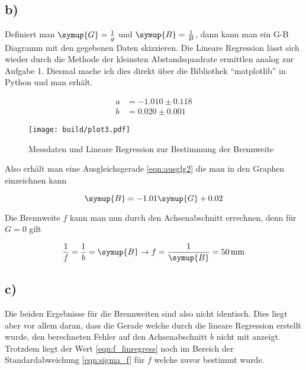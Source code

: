 \subsection{b)}
Definiert man $\symup{G} = \frac{1}{g}$ und $\symup{B} = \frac{1}{B}$, dann kann man ein G-B Diagramm mit den gegebenen
Daten skizzieren. Die Lineare Regression lässt sich wieder durch die Methode der kleinsten Abstandsquadrate ermittlen analog zur Aufgabe 1. Diesmal mache ich dies direkt
über die Bibliothek \enquote{matplotlib} in Python und man erhält.

\begin{align}
a &= -1.010 \pm 0.118 \\
b &= 0.020 \pm 0.001
\end{align}
\newpage
\begin{figure}[t]
  \centering
  \texttt{[image: build/plot3.pdf]}
  \caption{Messdaten und Lineare Regression zur Bestimmung der Brennweite}
  \label{fig:plot3}
\end{figure}
\begin{flushleft}
Also erhält man eine Ausgleichsgerade \eqref{eqn:ausglg2} die man in den Graphen einzeichnen kann
\end{flushleft}
\begin{equation}
\symup{B} = -1.01 \symup{G} + 0.02
\label{eqn:ausglg2}
\end{equation}
\begin{flushleft}
Die Brennweite $f$ kann man nun durch den Achsenabschnitt errechnen, denn für $G=0$ gilt
\end{flushleft}
\begin{equation}
\frac{1}{f} = \frac{1}{b} = \symup{B} \to f = \frac{1}{\symup{B}} = \SI{50}{\milli\meter}
\label{eqn:f_linregress}
\end{equation}
\subsection{c)}
Die beiden Ergebnisse für die Brennweiten sind also nicht identisch.
Dies liegt aber vor allem daran, dass die Gerade welche durch die lineare Regression erstellt wurde, den berechneten Fehler auf den Achsenabschnitt $b$ nicht mit anzeigt.
Trotzdem liegt der Wert \eqref{eqn:f_linregress} noch im Bereich der Standardabweichung \eqref{eqn:sigma_f} für $f$ welche zuvor bestimmt wurde.
